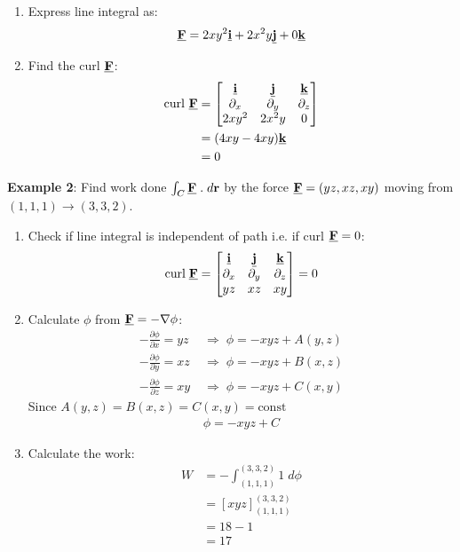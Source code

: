 \documentclass[10pt,a4paper]{article}
\begin{document}
\begin{enumerate}
    \item Express line integral as:
    $$\textbf{\underline{F}}=2xy^2\textbf{\underline{i}}+2x^2y\textbf{\underline{j}}+0\textbf{\underline{k}}$$
    \item Find the curl $\textbf{\underline{F}}$: 
    \begin{align*}
        \text{curl }\textbf{\underline{F}} &= 
        \begin{bmatrix}
            \textbf{\underline{i}} & \textbf{\underline{j}} & \textbf{\underline{k}} \\
            \partial_x & \partial_y & \partial_z \\
            2xy^2 & 2x^2y & 0
        \end{bmatrix}\\ &= (4xy - 4xy)\textbf{\underline{k}} \\ &= 0
    \end{align*}
\end{enumerate}

\textbf{Example 2}: Find work done $\int_C \textbf{\underline{F}}\;.\; d \textbf{r}$ by the force
$\textbf{\underline{F}}=(yz,xz,xy)$ moving from $(1,1,1) \rightarrow (3,3,2)$.
\begin{enumerate}
    \item Check if line integral is independent of path i.e. if curl $\textbf{\underline{F}}=0$:
    \begin{align*}
        \text{curl}\;\textbf{\underline{F}} = \begin{bmatrix}
            \textbf{\underline{i}} & \textbf{\underline{j}} & \textbf{\underline{k}} \\
            \partial_x & \partial_y & \partial_z \\
            yz & xz & xy
        \end{bmatrix} = 0
    \end{align*}

    \item Calculate $\phi$ from $\textbf{\underline{F}}=-\nabla\phi$:
    \begin{align*}
        -\frac{\partial \phi}{\partial x} = yz \;&\Rightarrow \;\phi = -xyz + A(y,z)\\
        -\frac{\partial \phi}{\partial y} = xz \;&\Rightarrow \;\phi = -xyz + B(x,z)\\
        -\frac{\partial \phi}{\partial z} = xy \;&\Rightarrow \;\phi = -xyz + C(x,y)
    \end{align*}
    Since $A(y,z) = B(x,z) = C(x,y) = \text{const}$
    \begin{align*}
        \phi = -xyz + C
    \end{align*}

    \item Calculate the work:
    \begin{align*}
        W &= - \int_{(1,1,1)}^{(3,3,2)} 1 \; d\phi \\
        &= [xyz]_{(1,1,1)}^{(3,3,2)} \\
        &= 18 -1 \\
        &= 17
    \end{align*}
\end{enumerate}
\end{document}
